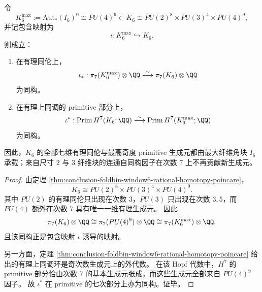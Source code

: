 \begin{theorem}\label{thm:conclusion-foldbin-window6-maxfiber-degree7-dominance}
令
\[
K_6^{\max}:=\mathrm{Aut}_{\ast}(I_6)^0\cong PU(4)^9
\subset
K_6\cong PU(2)^8\times PU(3)^4\times PU(4)^9,
\]
并记包含映射为
\[
\iota:K_6^{\max}\hookrightarrow K_6.
\]
则成立：
\begin{enumerate}
  \item 在有理同伦上，
  \[
  \iota_{\ast}:\pi_7(K_6^{\max})\otimes\QQ
  \overset{\sim}{\longrightarrow}
  \pi_7(K_6)\otimes\QQ
  \]
  为同构。
  \item 在有理上同调的 primitive 部分上，
  \[
  \iota^{\ast}:\operatorname{Prim}H^7(K_6;\QQ)
  \overset{\sim}{\longrightarrow}
  \operatorname{Prim}H^7(K_6^{\max};\QQ)
  \]
  为同构。
\end{enumerate}
因此，\(K_6\) 的全部七维有理同伦与最高奇度 primitive 生成元都由最大纤维角块 \(I_6\) 承载；来自尺寸 \(2\) 与 \(3\) 纤维块的连通自同构因子在次数 \(7\) 上不再贡献新生成元。
\end{theorem}
\begin{proof}
由定理 \ref{thm:conclusion-foldbin-window6-rational-homotopy-poincare}，
\[
K_6\cong PU(2)^8\times PU(3)^4\times PU(4)^9.
\]
其中 \(PU(2)\) 的有理同伦只出现在次数 \(3\)，\(PU(3)\) 只出现在次数 \(3,5\)，而 \(PU(4)\) 额外在次数 \(7\) 具有唯一一维有理生成元。
因此
\[
\pi_7(K_6)\otimes\QQ
\cong
\pi_7(PU(4)^9)\otimes\QQ
\cong
\pi_7(K_6^{\max})\otimes\QQ,
\]
且该同构正是包含映射 \(\iota\) 诱导的映射。

另一方面，定理 \ref{thm:conclusion-foldbin-window6-rational-homotopy-poincare} 给出的有理上同调环是奇次数生成元上的外代数。
在该 Hopf 代数中，\(H^7\) 的 primitive 部分恰由次数 \(7\) 的基本生成元张成，而这些生成元全部来自 \(PU(4)^9\) 因子。
故 \(\iota^\ast\) 在 primitive 的七次部分上亦为同构。证毕。
\end{proof}

\endinput
